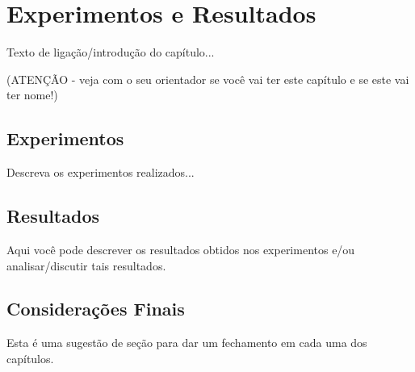 \chapter{Experimentos e Resultados} 
\label{cap:experimentos:resultados}

Texto de ligação/introdução do capítulo...

(ATENÇÃO - veja com o seu orientador se você vai ter este capítulo e se este vai ter nome!)

\section{Experimentos}
\label{cap:experimentos:sec:resultados:experimentos}

Descreva os experimentos realizados...

\section{Resultados}
\label{cap:experimentos:resultados:sec:resultados}

Aqui você pode descrever os resultados obtidos nos experimentos e/ou analisar/discutir tais resultados.

\section{Considerações Finais}
\label{cap:experimentos:resultados:sec:consideracoes:finais}

Esta é uma sugestão de seção para dar um fechamento em cada uma dos capítulos.